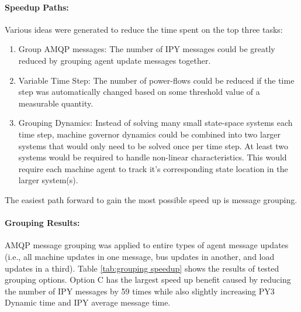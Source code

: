\documentclass[12pt]{article}
\begin{document}
\paragraph{Speedup Paths:} Various ideas were generated to reduce the time spent on the top three tasks:
\begin{enumerate}
\item Group AMQP messages: The number of IPY messages could be greatly reduced by grouping agent update messages together.
\item Variable Time Step: The number of power-flows could be reduced if the time step was automatically changed based on some threshold value of a measurable quantity.
\item Grouping Dynamics: Instead of solving many small state-space systems each time step, machine governor dynamics could be combined into two larger systems that would only need to be solved once per time step. At least two systems would be required to handle non-linear characteristics. This would require each machine agent to track it's corresponding state location in the larger system(s).
\end{enumerate}
The easiest path forward to gain the most possible speed up is message grouping.


\pagebreak
\paragraph{Grouping Results:} AMQP message grouping was applied to entire types of agent message updates (i.e., all machine updates in one message, bus updates in another, and load updates in a third). Table \ref{tab:grouping speedup} shows the results of tested grouping options. Option C has the largest speed up benefit caused by reducing the number of IPY messages by 59 times while also slightly increasing PY3 Dynamic time and IPY average message time.
\end{document}
